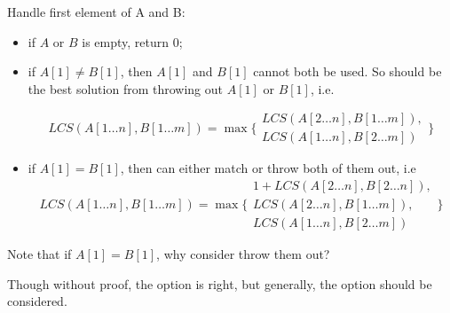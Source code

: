 Handle first element of A and B:
\begin{itemize}
    \item if $A$ or $B$ is empty, return $0$;
    \item if $A[1] \neq B[1]$, then $A[1]$ and $B[1]$ cannot both be used.
        So should be the best solution from throwing out $A[1]$ or $B[1]$, i.e.

        \begin{equation}
            LCS(A[1\ldots n], B[1\ldots m]) = \max\biggl\{
                        \begin{array}{ll}
                          LCS(A[2\ldots n], B[1\ldots m]),\\
                          LCS(A[1\ldots n], B[2\ldots m])
                        \end{array}
                    \biggr\}
        \end{equation}
    \item if $A[1] = B[1]$, then can either match or throw both of them out, i.e
        \begin{equation}
            LCS(A[1\ldots n], B[1\ldots m]) = \max\Biggl\{
                        \begin{array}{ll}
                          1+LCS(A[2\ldots n], B[2\ldots n]),\\
                          LCS(A[2\ldots n], B[1\ldots m]),\\
                          LCS(A[1\ldots n], B[2\ldots m])
                        \end{array}
                    \Biggr\}
        \end{equation}
\end{itemize}

Note that if $A[1] = B[1]$, why consider throw them out?

Though without proof, the option is right, but generally,
the option should be considered.


